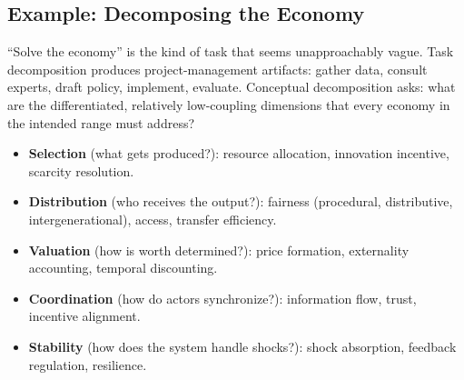 \documentclass[11pt]{article}
\begin{document}
\subsection{Example: Decomposing the Economy}

``Solve the economy'' is the kind of task that seems unapproachably vague. Task decomposition produces project-management artifacts: gather data, consult experts, draft policy, implement, evaluate. Conceptual decomposition asks: what are the differentiated, relatively low-coupling dimensions that every economy in the intended range must address?

\begin{itemize}[leftmargin=1.5em]
\item \textbf{Selection} (what gets produced?): resource allocation, innovation incentive, scarcity resolution.
\item \textbf{Distribution} (who receives the output?): fairness (procedural, distributive, intergenerational), access, transfer efficiency.
\item \textbf{Valuation} (how is worth determined?): price formation, externality accounting, temporal discounting.
\item \textbf{Coordination} (how do actors synchronize?): information flow, trust, incentive alignment.
\item \textbf{Stability} (how does the system handle shocks?): shock absorption, feedback regulation, resilience.
\end{itemize}
\end{document}
